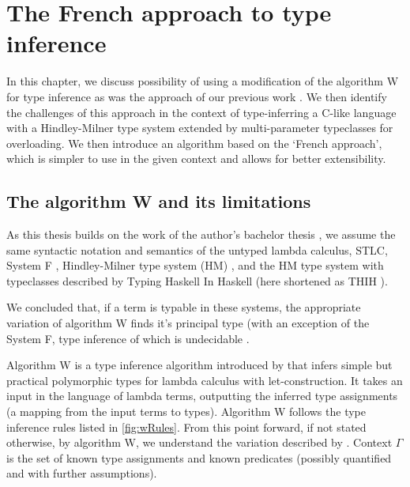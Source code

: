 \chapter{The French approach to type inference}

\label{chap1}

In this chapter, we discuss possibility of using a modification of the algorithm W \cite{damas1982principal} for type inference as was the approach of our previous work \cite{klepl2020type}. We then identify the challenges of this approach in the context of type-inferring a C-like language with a Hindley-Milner \cite{damas1982principal} type system extended by multi-parameter typeclasses for overloading. We then introduce an algorithm based on the `French approach', which is simpler to use in the given context and allows for better extensibility.

\section{The algorithm W and its limitations}

As this thesis builds on the work of the author's bachelor thesis \cite{klepl2020type}, we assume the same syntactic notation and semantics of the untyped lambda calculus, STLC, System F \cite{barendregt1992lambda}, Hindley-Milner type system (HM) \cite{damas1982principal}, and the HM type system with typeclasses described by Typing Haskell In Haskell (here shortened as THIH \cite{jones1999typing}).

We concluded that, if a term is typable in these systems, the appropriate variation of algorithm W finds it's principal type (with an exception of the System F, type inference of which is undecidable \cite{wells1999typability}.

Algorithm W is a type inference algorithm introduced by \citet{damas1982principal} that infers simple but practical polymorphic types for lambda calculus with let-construction. It takes an input in the language of lambda terms, outputting the inferred type assignments (a mapping from the input terms to types). Algorithm W follows the type inference rules listed in \cref{fig:wRules}. From this point forward, if not stated otherwise, by algorithm W, we understand the variation described by \citet{jones1999typing}. Context $\Gamma$ is the set of known type assignments and known predicates (possibly quantified and with further assumptions).

